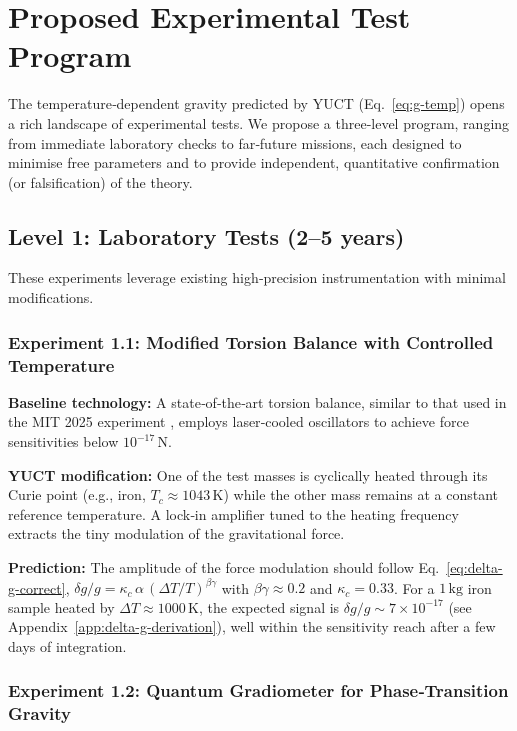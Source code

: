 \documentclass[12pt]{article}
\theoremstyle{remark}
\begin{document}
	
	\section{Proposed Experimental Test Program}
	\label{sec:experiments}
	
	The temperature‑dependent gravity predicted by YUCT (Eq.~\ref{eq:g-temp}) opens a rich landscape of experimental tests.  
	We propose a three‑level program, ranging from immediate laboratory checks to far‑future missions, each designed to
	minimise free parameters and to provide independent, quantitative confirmation (or falsification) of the theory.
	
	\subsection{Level 1: Laboratory Tests (2–5 years)}
	\label{subsec:lab-tests}
	
	These experiments leverage existing high‑precision instrumentation with minimal modifications.
	
	\subsubsection{Experiment 1.1: Modified Torsion Balance with Controlled Temperature}
	
	\textbf{Baseline technology:} A state‑of‑the‑art torsion balance, similar to that used in the MIT 2025 experiment
	\cite{MIT2025}, employs laser‑cooled oscillators to achieve force sensitivities below \(10^{-17}\,\mathrm{N}\).
	
	\textbf{YUCT modification:} One of the test masses is cyclically heated through its Curie point (e.g., iron,
	\(T_c\approx1043\,\mathrm{K}\)) while the other mass remains at a constant reference temperature.  
	A lock‑in amplifier tuned to the heating frequency extracts the tiny modulation of the gravitational force.
	
	\textbf{Prediction:} The amplitude of the force modulation should follow Eq.~\ref{eq:delta-g-correct},
	\(\delta g/g = \kappa_c\,\alpha\,(\Delta T/T)^{\beta\gamma}\) with \(\beta\gamma\approx0.2\) and \(\kappa_c=0.33\).  
	For a \(1\,\mathrm{kg}\) iron sample heated by \(\Delta T\approx1000\,\mathrm{K}\), the expected signal is
	\(\delta g/g \sim 7\times10^{-17}\) (see Appendix~\ref{app:delta-g-derivation}), well within the sensitivity reach
	after a few days of integration.
	
	\subsubsection{Experiment 1.2: Quantum Gradiometer for Phase‑Transition Gravity}
	
\end{document}

